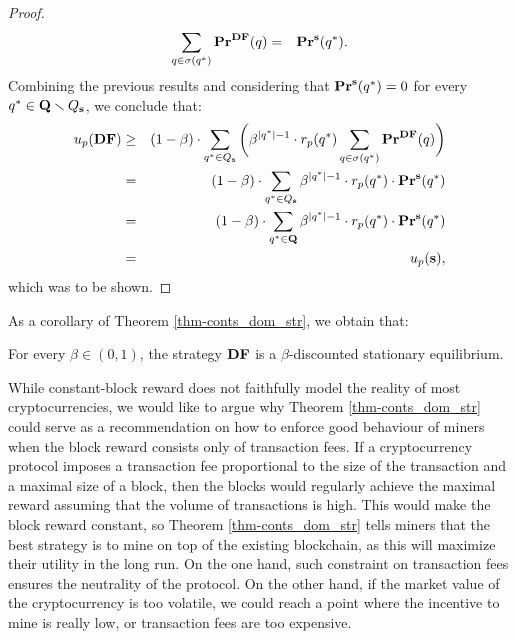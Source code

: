\begin{proof}
\begin{eqnarray*}
\sum_{q \in \sigma(q^*)} \mathbf{Pr}^{\text{\rm {\bf DF}}}(q) & = & \mathbf{Pr}^{\mathbf{s}}(q^*).
\end{eqnarray*}
Combining the previous results and considering that $\mathbf{Pr}^{\mathbf{s}}(q^*) = 0$ for every $q^* \in \mathbf{Q} \smallsetminus Q_{\mathbf{s}}$, we conclude that: 
\begin{eqnarray*}
u_p(\text{\rm {\bf DF}}) & \geq & (1-\beta) \cdot \sum_{q^* \in Q_{\mathbf{s}}} \bigg(\beta^{|q^*|-1} \cdot r_p(q^*) \sum_{q \in \sigma(q^*)} \mathbf{Pr}^{\text{\rm {\bf DF}}}(q)\bigg)\\
& = &(1-\beta) \cdot \sum_{q^* \in Q_{\mathbf{s}}} \beta^{|q^*|-1} \cdot r_p(q^*) \cdot \mathbf{Pr}^{\mathbf{s}}(q^*)\\
& = &(1-\beta) \cdot \sum_{q^* \in \mathbf{Q}} \beta^{|q^*|-1} \cdot r_p(q^*) \cdot \mathbf{Pr}^{\mathbf{s}}(q^*)\\
& = & u_p(\mathbf{s}), 
\end{eqnarray*}
which was to be shown.
\end{proof}
As a corollary of Theorem \ref{thm-conts_dom_str}, we obtain that:
\begin{mycor}\label{cor-conts_equlibria}
For every $\beta \in (0,1)$, the strategy $\text{\rm {\bf DF}}$ is a $\beta$-discounted stationary equilibrium.
\end{mycor} 
While constant-block reward does not faithfully model the reality of most cryptocurrencies, 
we would like to argue why Theorem \ref{thm-conts_dom_str} could serve as a recommendation on how to enforce good behaviour of miners when the block reward consists only of transaction fees. If a cryptocurrency protocol imposes a transaction fee proportional to the size of the transaction and a maximal size of a block, then the blocks would regularly achieve the maximal reward assuming that the volume of transactions is high. This would make the block reward constant, so Theorem \ref{thm-conts_dom_str} tells miners that the best strategy is to mine on top of the existing blockchain, as this will maximize their utility in the long run. On the one hand, such constraint on transaction fees ensures the neutrality of the %
protocol. On the other hand, if the market value of the cryptocurrency is too volatile, we could reach a point where the incentive to mine is really low, or transaction fees are too expensive. 
%
